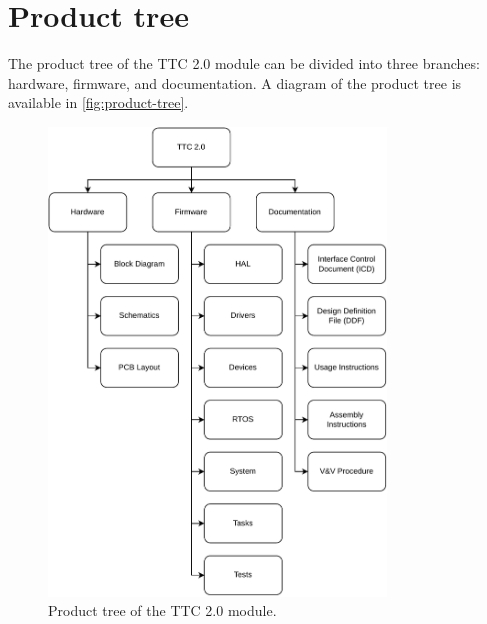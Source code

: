 \section{Product tree}

The product tree of the TTC 2.0 module can be divided into three branches: hardware, firmware, and documentation. A diagram of the product tree is available in \autoref{fig:product-tree}.

\begin{figure}[!ht]
    \begin{center}
        \includegraphics[width=0.8\textwidth]{figures/product-tree.pdf}
        \caption{Product tree of the TTC 2.0 module.}
        \label{fig:product-tree}
    \end{center}
\end{figure}